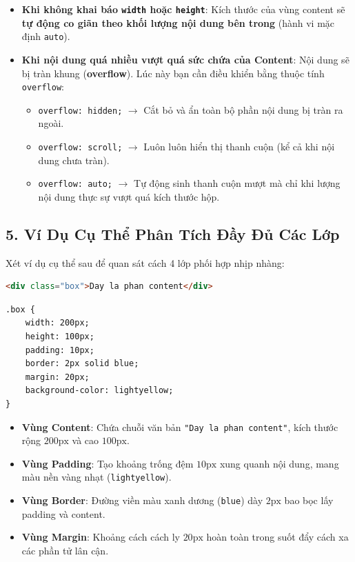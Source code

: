\documentclass[11pt,oneside]{book}
\newcommand{\codeinline}[1]{\textcolor{accentOrange}{\texttt{#1}}}
\newcommand{\term}[1]{\textbf{\textcolor{primaryBlue}{#1}}}
\begin{document}
\begin{warnBox}
\begin{itemize}[leftmargin=1.5em, itemsep=3.5pt, parsep=0pt]
    \item \textbf{Khi không khai báo \codeinline{width} hoặc \codeinline{height}}: Kích thước của vùng content sẽ \textbf{tự động co giãn theo khối lượng nội dung bên trong} (hành vi mặc định \codeinline{auto}).
    \item \textbf{Khi nội dung quá nhiều vượt quá sức chứa của Content}: Nội dung sẽ bị tràn khung (\term{overflow}). Lúc này bạn cần điều khiển bằng thuộc tính \codeinline{overflow}:
    \begin{itemize}[leftmargin=1.2em, itemsep=2pt, parsep=0pt]
        \item \codeinline{overflow: hidden;} $\rightarrow$ Cắt bỏ và ẩn toàn bộ phần nội dung bị tràn ra ngoài.
        \item \codeinline{overflow: scroll;} $\rightarrow$ Luôn luôn hiển thị thanh cuộn (kể cả khi nội dung chưa tràn).
        \item \codeinline{overflow: auto;} $\rightarrow$ Tự động sinh thanh cuộn mượt mà chỉ khi lượng nội dung thực sự vượt quá kích thước hộp.
    \end{itemize}
\end{itemize}
\end{warnBox}

\subsection{5. Ví Dụ Cụ Thể Phân Tích Đầy Đủ Các Lớp}

Xét ví dụ cụ thể sau để quan sát cách 4 lớp phối hợp nhịp nhàng:

\begin{codeWindow}
\begin{lstlisting}[language=HTML]
<div class="box">Day la phan content</div>
\end{lstlisting}
\begin{lstlisting}[language=CSS3]
.box {
    width: 200px;
    height: 100px;
    padding: 10px;
    border: 2px solid blue;
    margin: 20px;
    background-color: lightyellow;
}
\end{lstlisting}
\end{codeWindow}

\begin{itemize}[leftmargin=1.5em, itemsep=3pt, parsep=0pt]
    \item \textbf{Vùng Content}: Chứa chuỗi văn bản \texttt{"Day la phan content"}, kích thước rộng $200\text{px}$ và cao $100\text{px}$.
    \item \textbf{Vùng Padding}: Tạo khoảng trống đệm $10\text{px}$ xung quanh nội dung, mang màu nền vàng nhạt (\codeinline{lightyellow}).
    \item \textbf{Vùng Border}: Đường viền màu xanh dương (\codeinline{blue}) dày $2\text{px}$ bao bọc lấy padding và content.
    \item \textbf{Vùng Margin}: Khoảng cách cách ly $20\text{px}$ hoàn toàn trong suốt đẩy cách xa các phần tử lân cận.
\end{itemize}
\end{document}
